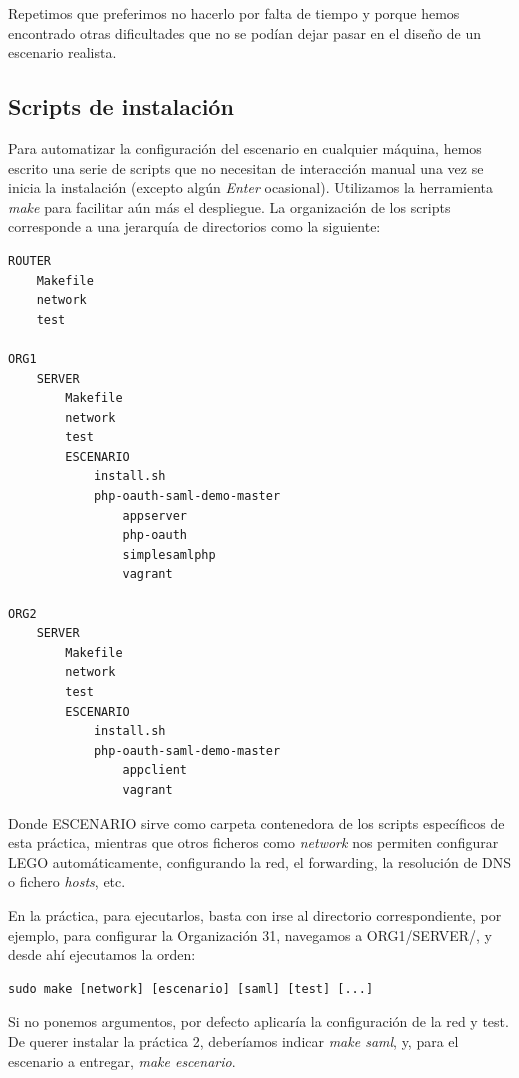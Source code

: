 \documentclass[]{article}
\begin{document}
\hfill

Repetimos que preferimos no hacerlo por falta de tiempo y porque hemos encontrado otras dificultades que no se podían dejar pasar en el diseño de un escenario realista.

\subsection{Scripts de instalación}

Para automatizar la configuración del escenario en cualquier máquina, hemos escrito una serie de scripts que no necesitan de interacción manual una
vez se inicia la instalación (excepto algún \textit{Enter} ocasional). Utilizamos la herramienta \textit{make} para facilitar aún más
el despliegue. La organización de los scripts corresponde a una jerarquía de directorios como la siguiente:

\hfil

\begin{BVerbatim}
ROUTER
	Makefile
	network
	test

ORG1
	SERVER
		Makefile
		network
		test
		ESCENARIO
			install.sh
			php-oauth-saml-demo-master
				appserver
				php-oauth
				simplesamlphp
				vagrant

ORG2
	SERVER
		Makefile
		network
		test
		ESCENARIO
			install.sh
			php-oauth-saml-demo-master
				appclient
				vagrant
\end{BVerbatim}

\hfill


Donde ESCENARIO sirve como carpeta contenedora de los scripts específicos de esta práctica, mientras que otros ficheros como \textit{network} nos
permiten configurar LEGO automáticamente, configurando la red, el forwarding, la resolución de DNS o fichero \textit{hosts}, etc.



\hfill

En la práctica, para ejecutarlos, basta con irse al directorio correspondiente, por ejemplo, para configurar la Organización 31, navegamos a ORG1/SERVER/, y desde ahí
ejecutamos la orden:

\begin{verbatim}
sudo make [network] [escenario] [saml] [test] [...]
\end{verbatim}

Si no ponemos argumentos, por defecto aplicaría la configuración de la red y test. De querer instalar la práctica 2, deberíamos indicar \textit{make saml}, y, para el escenario a entregar, \textit{make escenario}.
\end{document}
